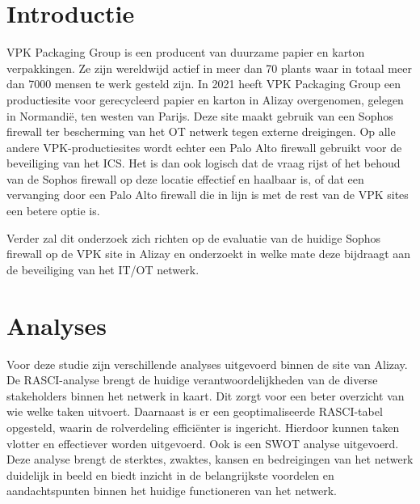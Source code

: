 \documentclass[a0,portrait]{hogent-poster}
\begin{document}
\begin{multicols}{2} %

\section{Introductie}
VPK Packaging Group is een producent van duurzame papier en karton verpakkingen. Ze zijn wereldwijd actief in meer dan 70 plants waar in totaal meer dan 7000 mensen te werk gesteld zijn. In 2021 heeft VPK Packaging Group een productiesite voor gerecycleerd papier en karton in Alizay overgenomen, gelegen in Normandië, ten westen van Parijs. Deze site maakt gebruik van een Sophos firewall ter bescherming van het OT netwerk tegen externe dreigingen. Op alle andere VPK-productiesites wordt echter een Palo Alto firewall gebruikt voor de beveiliging van het ICS. Het is dan ook logisch dat de vraag rijst of het behoud van de Sophos firewall op deze locatie effectief en haalbaar is, of dat een vervanging door een Palo Alto firewall die in lijn is met de rest van de VPK sites een betere optie is.

Verder zal dit onderzoek zich richten op de evaluatie van de huidige Sophos firewall op de VPK site in Alizay en onderzoekt in welke mate deze bijdraagt aan de beveiliging van het IT/OT netwerk.
\newline

\begin{center}
    \captionsetup{type=figure}
\end{center}


\section{Analyses}
Voor deze studie zijn verschillende analyses uitgevoerd binnen de site van Alizay. De RASCI-analyse brengt de huidige verantwoordelijkheden van de diverse stakeholders binnen het netwerk in kaart. Dit zorgt voor een beter overzicht van wie welke taken uitvoert. Daarnaast is er een geoptimaliseerde RASCI-tabel opgesteld, waarin de rolverdeling efficiënter is ingericht. Hierdoor kunnen taken vlotter en effectiever worden uitgevoerd. Ook is een SWOT analyse uitgevoerd. Deze analyse brengt de sterktes, zwaktes, kansen en bedreigingen van het netwerk duidelijk in beeld en biedt inzicht in de belangrijkste voordelen en aandachtspunten binnen het huidige functioneren van het netwerk.


\end{multicols}
\end{document}
